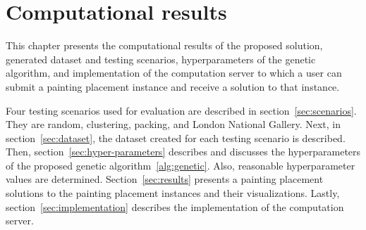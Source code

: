 \chapter{Computational results}\label{ch:computational-results}

This chapter presents the computational results of the proposed solution,
generated dataset and testing scenarios, hyperparameters of the genetic algorithm,
and implementation of the computation server
to which a user can submit a painting placement instance and receive a solution to that instance.

Four testing scenarios used for evaluation are described in
section~\ref{sec:scenarios}.
They are random, clustering, packing, and London National Gallery.
Next, in section~\ref{sec:dataset}, the dataset created for each testing scenario is described.
Then, section~\ref{sec:hyper-parameters} describes and discusses
the hyperparameters of the proposed genetic algorithm~\ref{alg:genetic}.
Also, reasonable hyperparameter values are determined.
Section~\ref{sec:results} presents a painting placement solutions to the painting placement instances and their visualizations.
Lastly, section~\ref{sec:implementation} describes the implementation of the computation server.






